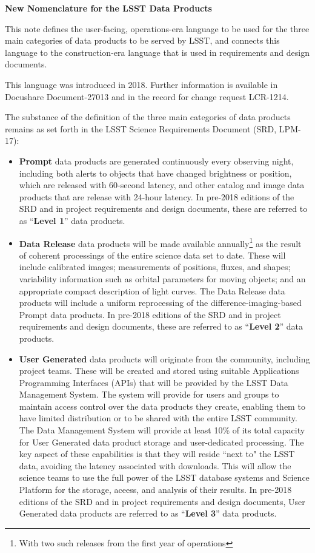 \documentclass[12pt]{article}
\begin{document}
\vskip 0.2in
\centerline{\bf New Nomenclature for the LSST Data Products}
\vskip 0.1in

This note defines the user-facing, operations-era language to be used for the three
main categories of data products to be served by LSST, and connects this language to
the construction-era language that is used in requirements and design documents.

This language was introduced in 2018.
Further information is available in Docushare Document-27013 and in the record for change request LCR-1214.

The substance of the definition of the three main categories of data products remains as set forth in the LSST Science Requirements Document (SRD, LPM-17):

\begin{itemize}
\item {\bf Prompt} data products are generated continuously every observing night, including both alerts to objects that have changed brightness or position, which are released with 60-second latency, and other catalog and image data products that are release with 24-hour latency.
In pre-2018 editions of the SRD and in project requirements and design documents, these are referred to as ``{\bf Level 1}'' data products.
\item {\bf Data Release} data products will be made available annually\footnote{With two such releases from the first year of operations} as the result of coherent processings of the entire science data set to date.
These will include calibrated images; measurements of positions, fluxes, and shapes; variability information such as orbital parameters for moving objects; and an appropriate compact description of light curves.
The Data Release data products will include a uniform reprocessing of the difference-imaging-based Prompt data products.
In pre-2018 editions of the SRD and in project requirements and design documents, these are referred to as ``{\bf Level 2}'' data products.
\item {\bf User Generated} data products will originate from the community, including project teams.
These will be created and stored using suitable Applications Programming Interfaces (APIs) that will be provided by the LSST Data Management System.
The system will provide for users and groups to maintain access control over the data products they create, enabling them to have limited distribution or to be shared with the entire LSST community.
The Data Management System will provide at least 10\% of its total capacity for User Generated data product storage and user-dedicated processing.
The key aspect of these capabilities is that they will reside ``next to" the LSST data, avoiding the latency associated with downloads.
This will allow the science teams to use the full power of the LSST database systems and Science Platform for the storage, aceess, and analysis of their results.
In pre-2018 editions of the SRD and in project requirements and design documents, User Generated data products are referred to as ``{\bf Level 3}'' data products.
\end{itemize}
\end{document}
